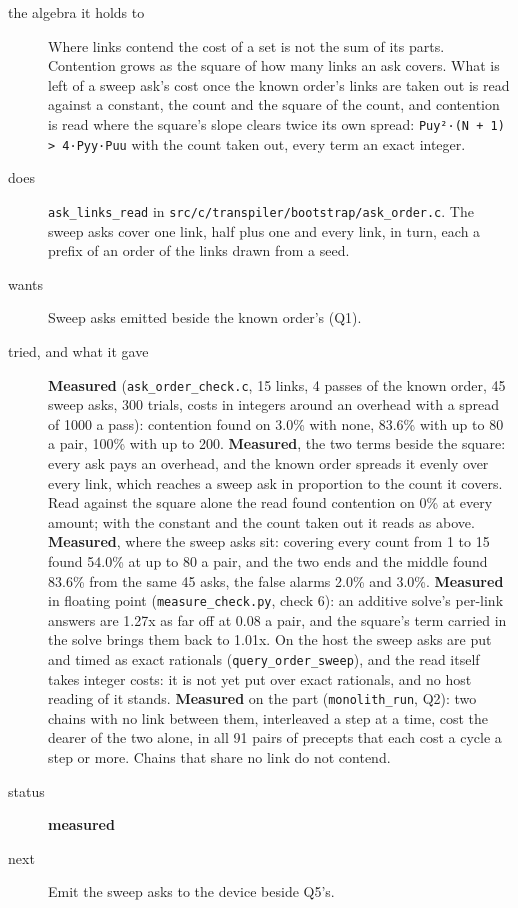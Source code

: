 \begin{description}
\item[{the algebra it holds to}] Where links contend the cost of a set is not the sum of its parts. Contention grows as the square of how many links an ask covers. What is left of a sweep ask's cost once the known order's links are taken out is read against a constant, the count and the square of the count, and contention is read where the square's slope clears twice its own spread: \texttt{Puy²·(N + 1) > 4·Pyy·Puu} with the count taken out, every term an exact integer.
\item[{does}] \texttt{ask\_\allowbreak{}links\_\allowbreak{}read} in \texttt{src/\allowbreak{}c/\allowbreak{}transpiler/\allowbreak{}bootstrap/\allowbreak{}ask\_\allowbreak{}order.\allowbreak{}c}. The sweep asks cover one link, half plus one and every link, in turn, each a prefix of an order of the links drawn from a seed.
\item[{wants}] Sweep asks emitted beside the known order's (Q1).
\item[{tried, and what it gave}] \textbf{Measured} (\texttt{ask\_\allowbreak{}order\_\allowbreak{}check.\allowbreak{}c}, 15 links, 4 passes of the known order, 45 sweep asks, 300 trials, costs in integers around an overhead with a spread of 1000 a pass): contention found on 3.0\% with none, 83.6\% with up to 80 a pair, 100\% with up to 200. \textbf{Measured}, the two terms beside the square: every ask pays an overhead, and the known order spreads it evenly over every link, which reaches a sweep ask in proportion to the count it covers. Read against the square alone the read found contention on 0\% at every amount; with the constant and the count taken out it reads as above. \textbf{Measured}, where the sweep asks sit: covering every count from 1 to 15 found 54.0\% at up to 80 a pair, and the two ends and the middle found 83.6\% from the same 45 asks, the false alarms 2.0\% and 3.0\%. \textbf{Measured} in floating point (\texttt{measure\_\allowbreak{}check.\allowbreak{}py}, check 6): an additive solve's per-link answers are 1.27x as far off at 0.08 a pair, and the square's term carried in the solve brings them back to 1.01x. On the host the sweep asks are put and timed as exact rationals (\texttt{query\_\allowbreak{}order\_\allowbreak{}sweep}), and the read itself takes integer costs: it is not yet put over exact rationals, and no host reading of it stands. \textbf{Measured} on the part (\texttt{monolith\_\allowbreak{}run}, Q2): two chains with no link between them, interleaved a step at a time, cost the dearer of the two alone, in all 91 pairs of precepts that each cost a cycle a step or more. Chains that share no link do not contend.
\item[{status}] \textbf{measured}
\item[{next}] Emit the sweep asks to the device beside Q5's.
\end{description}

